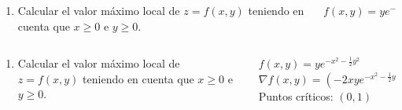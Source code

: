 \documentclass[aspectratio=169,10pt,t]{beamer}
\begin{document}
\begin{frame}
\begin{columns}
\begin{column}[T]{0.75\textwidth}
\begin{enumerate}
\item Calcular el valor máximo local de $z=f(x,y)$ teniendo en cuenta que $x\geq 0$ e $y\geq 0$.
\end{enumerate}
\end{column}
\begin{column}[T]{0.25\textwidth}
\begin{datos}
$f(x,y)=ye^{-x^2-\frac{1}{2}y^2}$
\end{datos}
\end{column}
\end{columns}
\end{frame}


\begin{frame}
\begin{columns}
\begin{column}[T]{0.53\textwidth}
\begin{enumerate}
  \item Calcular el valor máximo local de $z=f(x,y)$ teniendo en cuenta que $x\geq 0$ e $y\geq 0$.
\end{enumerate}
\end{column}
\begin{column}[T]{0.47\textwidth}
\begin{datos}
$f(x,y)=ye^{-x^2-\frac{1}{2}y^2}$\\
$\nabla f(x,y)=\left(-2xye^{-x^2-\frac{1}{2}y^2}, (1-y^2)e^{-x^2-\frac{1}{2}y^2}\right)$\\
Puntos críticos: $(0,1)$
\end{datos}
\end{column}
\end{columns}
\end{frame}
\end{document}

